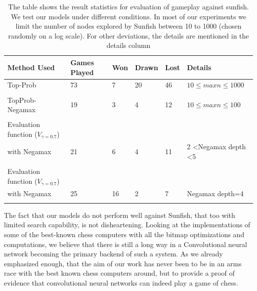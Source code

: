 \begin{table}[width=1.5\textwidth]
\centering
\hspace*{-1.0in}
\begin{tabular}{@{}llllll@{}}
\toprule
{\bf Method Used} & Games Played & Won & Drawn & Lost & 
Details                      \\ \midrule
Top-Prob          & 73           & 7         & 20          & 46         & 
$10\leq maxn\leq 1000$ \\\\
TopProb-Negamax&19     &3        &4		   & 12           & 
$10\leq maxn\leq 100$ \\\\
Evaluation function ($V_{\gamma=0.7}$)&&&&&\\
with Negamax &   21      & 6  &   4           & 11       &  2 \textless Negamax 
depth \textless 5 \\\\
Evaluation function ($V_{\gamma=0.7}$)&&&&&\\
with Negamax& 25        &  16 & 2             & 7       & Negamax depth=4       
                      \\\\
                      \bottomrule
\end{tabular}
\hspace*{-1.2in}
\caption[Results against negamax]{The table shows the result statistics for 
evaluation of gameplay against sunfish. We test our models under different 
conditions. In most of our experiments we limit the number of nodes explored by 
Sunfish between 10 to 1000 (chosen randomly on a log scale). For other 
deviations, the details are mentioned in the details column}
\label{table:gameplay}
\end{table}

The fact that our models do not perform well against Sunfish, that too with 
limited search capability, is not disheartening. Looking at the implementations 
of some of the best-known chess computers with all the bitmap optimizations 
and computations, we believe that there is still a long way in a Convolutional 
neural network becoming the primary backend of such a system. As we already 
emphasized enough, that the aim of our work has never been to be in an arms 
race with the best known chess computers around, but to provide a proof of 
evidence that convolutional neural networks can indeed play a game of chess.\\

